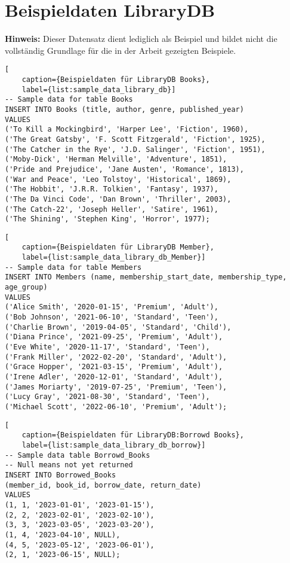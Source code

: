 \chapter*{Beispieldaten LibraryDB}
\label{sec:library_db_sample_data} \textbf{Hinweis:} Dieser Datensatz dient
lediglich als Beispiel und bildet nicht die vollständig Grundlage für die in der
Arbeit gezeigten Beispiele.

\begin{lstlisting}[
    caption={Beispieldaten für LibraryDB Books},
    label={list:sample_data_library_db}]
-- Sample data for table Books
INSERT INTO Books (title, author, genre, published_year)
VALUES
('To Kill a Mockingbird', 'Harper Lee', 'Fiction', 1960),
('The Great Gatsby', 'F. Scott Fitzgerald', 'Fiction', 1925),
('The Catcher in the Rye', 'J.D. Salinger', 'Fiction', 1951),
('Moby-Dick', 'Herman Melville', 'Adventure', 1851),
('Pride and Prejudice', 'Jane Austen', 'Romance', 1813),
('War and Peace', 'Leo Tolstoy', 'Historical', 1869),
('The Hobbit', 'J.R.R. Tolkien', 'Fantasy', 1937),
('The Da Vinci Code', 'Dan Brown', 'Thriller', 2003),
('The Catch-22', 'Joseph Heller', 'Satire', 1961),
('The Shining', 'Stephen King', 'Horror', 1977);
\end{lstlisting}

\begin{lstlisting}[
    caption={Beispieldaten für LibraryDB Member},
    label={list:sample_data_library_db_Member}]
-- Sample data for table Members
INSERT INTO Members (name, membership_start_date, membership_type, age_group)
VALUES
('Alice Smith', '2020-01-15', 'Premium', 'Adult'),
('Bob Johnson', '2021-06-10', 'Standard', 'Teen'),
('Charlie Brown', '2019-04-05', 'Standard', 'Child'),
('Diana Prince', '2021-09-25', 'Premium', 'Adult'),
('Eve White', '2020-11-17', 'Standard', 'Teen'),
('Frank Miller', '2022-02-20', 'Standard', 'Adult'),
('Grace Hopper', '2021-03-15', 'Premium', 'Adult'),
('Irene Adler', '2020-12-01', 'Standard', 'Adult'),
('James Moriarty', '2019-07-25', 'Premium', 'Teen'),
('Lucy Gray', '2021-08-30', 'Standard', 'Teen'),
('Michael Scott', '2022-06-10', 'Premium', 'Adult');
\end{lstlisting}

\filbreak

\begin{lstlisting}[
    caption={Beispieldaten für LibraryDB:Borrowd Books},
    label={list:sample_data_library_db_borrow}]
-- Sample data table Borrowd_Books
-- Null means not yet returned
INSERT INTO Borrowed_Books
(member_id, book_id, borrow_date, return_date)
VALUES
(1, 1, '2023-01-01', '2023-01-15'),
(2, 2, '2023-02-01', '2023-02-10'),
(3, 3, '2023-03-05', '2023-03-20'),
(1, 4, '2023-04-10', NULL),
(4, 5, '2023-05-12', '2023-06-01'),
(2, 1, '2023-06-15', NULL);
\end{lstlisting}